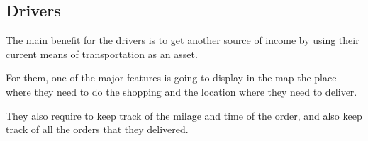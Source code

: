 \subsection{Drivers}
The main benefit for the drivers is to get another source of income by using 
their current means of transportation as an asset. \newline

\noindent For them, one of the major features is going to display in the map 
the place where they need to do the shopping and the location where they need 
to deliver. \newline

\noindent They also require to keep track of the milage and time of the order, 
and also keep track of all the orders that they delivered.

